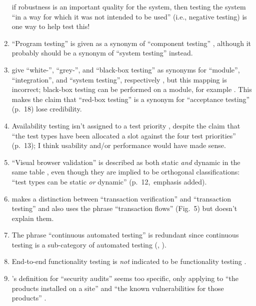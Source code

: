 \begin{enumerate}[resume]
            if robustness is an important quality for the system, then testing
            the system ``in a way for which it was not intended to be used''
            \citepISTQB{} (i.e., negative testing) is one way to help
            test this!
      \item ``Program testing'' is given as a synonym of ``component testing''
            \citep[p.~46]{Kam2008}, although it probably should be a synonym of
            ``system testing'' instead.
      \item \citeauthor{SneedAndGöschl2000} give ``white-'', ``grey-'', and
            ``black-box testing'' as synonyms for ``module'', ``integration'',
            and ``system testing'', respectively
            \citeyearpar[p.~18]{SneedAndGöschl2000} , but
            this mapping is incorrect; black-box testing can be performed on a
            module, for example . This makes the claim that
            ``red-box testing'' is a synonym for ``acceptance testing'' (p.~18)
            lose credibility.
      \item Availability testing isn't assigned to a test priority
            \citep[Tab.~2]{Gerrard2000a}, despite the claim that ``the test
            types have been allocated a slot against
            the four test priorities'' (p.~13); I think usability and/or
            performance would have made sense.
      \item ``Visual browser validation'' is described as both static \emph{and}
            dynamic in the same table \citep[Tab.~2]{Gerrard2000a}, even though
            they are implied to be orthogonal classifications: ``test
            types can be static \emph{or} dynamic'' (p.~12,~emphasis added).
      \item \citeauthor{Gerrard2000a} makes a distinction between ``transaction
            verification'' and ``transaction testing''
            \citeyearpar[Tab.~2]{Gerrard2000a} and also uses the phrase
            ``transaction flows'' (Fig.~5) but doesn't explain them.
      \item The phrase ``continuous automated testing''  \citep[p.~11]{Gerrard2000a}
            is redundant since continuous testing is a sub-category of automated
            testing (\citealp[p.~35]{IEEE2022}, \citealpISTQB{}).
      \item End-to-end functionality testing is \emph{not} indicated to be
            functionality testing \citep[Tab.~2]{Gerrard2000a}.
      \item \citeauthor{Gerrard2000b}'s definition for ``security audits''
            seems too specific, only applying to ``the products installed on a
            site'' and ``the known vulnerabilities for those products''
            \citeyearpar[p.~28]{Gerrard2000b}.
\end{enumerate}


